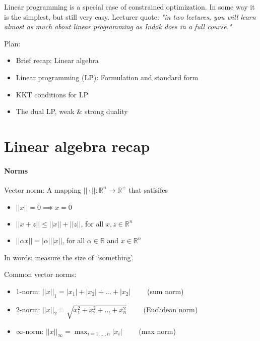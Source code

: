 \documentclass{article}
\begin{document}
\maketitle

Linear programming is a special case of constrained optimization. In some way it is the simplest, but still
very easy. Lecturer quote: \textit{"in two lectures, you will learn almost as much about linear programming as Indøk does in a full course."}

\medskip Plan:
\begin{itemize}
  \item Brief recap: Linear algebra
  \item Linear programming (LP): Formulation and standard form
  \item KKT conditions for LP
  \item The dual LP, weak \& strong duality
\end{itemize}

\section{Linear algebra recap}

\paragraph{Norms} Vector norm: A mapping $||\cdot|| : \mathbb{R}^{n} \to \mathbb{R}^{+}$ that satisifes
\begin{itemize}
  \item $||x|| = 0 \implies x = 0$
  \item $||x + z|| \leq ||x|| + ||z||$, for all $x,z \in\mathbb{R}^{n}$
  \item $||\alpha x|| = |\alpha|||x||$, for all $\alpha \in\mathbb{R}$ and $x \in\mathbb{R}^{n}$
\end{itemize}

In words: measure the size of ``something'.

\medskip Common vector norms:
\begin{itemize}
  \item 1-norm: $||x||_1 = |x_1| + |x_2| + \dots + |x_2| \qquad$ (sum norm)
  \item 2-norm: $||x||_2 = \sqrt{x_1^2 + x_2^2 + \dots + x_n^2} \qquad$ (Euclidean norm)
  \item $\infty$-norm: $||x||_{\infty} = \max_{i = 1,\dots , n}|x_i| \qquad$ (max norm)
\end{itemize}
\end{document}
